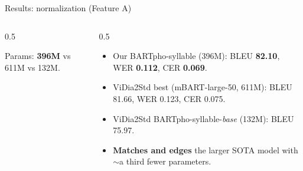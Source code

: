 \documentclass[aspectratio=169,11pt]{beamer}
\newcommand{\hl}[1]{\textcolor{oiblue}{\textbf{#1}}}
\begin{document}
\begin{frame}{Results: normalization (Feature A)}
  \begin{columns}[T]
    \begin{column}{0.5\textwidth}
      \centering
      \par\scriptsize Params: \hl{396M} vs 611M vs 132M.
    \end{column}
    \begin{column}{0.5\textwidth}
      \begin{itemize}\small
        \item Our BARTpho-syllable (396M): BLEU \hl{82.10}, WER \hl{0.112}, CER \hl{0.069}.
        \item ViDia2Std best (mBART-large-50, 611M): BLEU 81.66, WER 0.123, CER 0.075.
        \item ViDia2Std BARTpho-syllable-\emph{base} (132M): BLEU 75.97.
        \item[$\Rightarrow$] \hl{Matches and edges} the larger SOTA model with $\sim$a third fewer parameters.
      \end{itemize}
    \end{column}
  \end{columns}
\end{frame}
\end{document}

